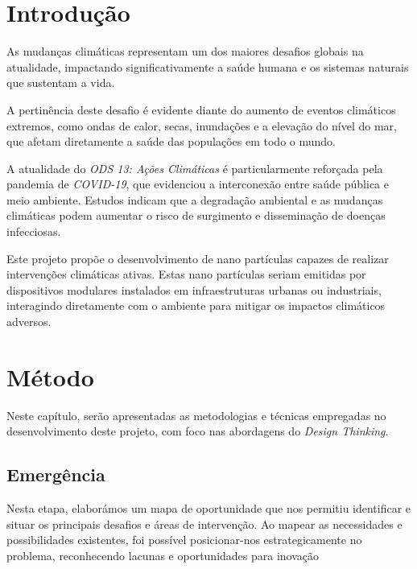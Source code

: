 \documentclass[a4paper, 11pt, onecolumn, oneside]{report}
\begin{document}
\chapter{Introdução}
\label{chap.introducao}
As mudanças climáticas representam um dos maiores desafios globais na atualidade, impactando significativamente a saúde humana e os sistemas naturais que sustentam a vida. 
\par
A pertinência deste desafio é evidente diante do aumento de eventos climáticos extremos, como ondas de calor, secas, inundações e a elevação do nível do mar, que afetam diretamente a saúde das populações em todo o mundo. \cite{ipcc_climate_change}
\par
A atualidade do \textit{ODS 13: Ações Climáticas} é particularmente reforçada pela pandemia de \textit{COVID-19}, que evidenciou a interconexão entre saúde pública e meio ambiente. Estudos indicam que a degradação ambiental e as mudanças climáticas podem aumentar o risco de surgimento e disseminação de doenças infecciosas.\cite{who_climate_health}
\par
Este projeto propõe o desenvolvimento de nano partículas capazes de realizar intervenções climáticas ativas. Estas nano partículas seriam emitidas por dispositivos modulares instalados em infraestruturas urbanas ou industriais, interagindo diretamente com o ambiente para mitigar os impactos climáticos adversos.

\chapter{Método}
\label{chap.metodo}
Neste capítulo, serão apresentadas as metodologias e técnicas empregadas no desenvolvimento deste projeto, com foco nas abordagens do \textit{Design Thinking}.

\section{Emergência}
Nesta etapa, elaborámos um mapa de oportunidade que nos permitiu identificar e situar os principais desafios e áreas de intervenção. Ao mapear as necessidades e possibilidades existentes, foi possível posicionar-nos estrategicamente no problema, reconhecendo lacunas e oportunidades para inovação
\end{document}
